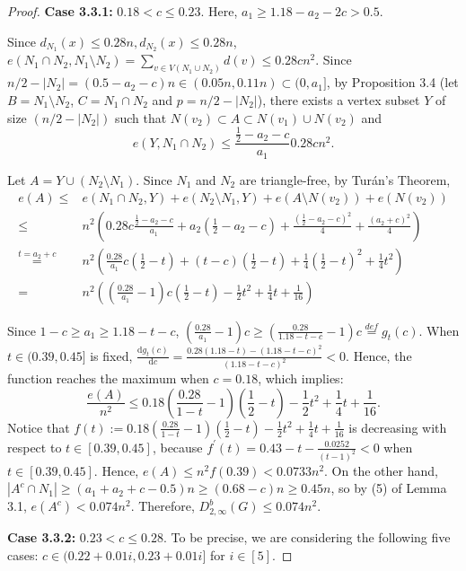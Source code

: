 \documentclass[11pt, oneside]{article}   	%
\begin{document}
\begin{proof}
\textbf{Case 3.3.1:} $0.18<c\leq 0.23$. Here, $a_1\geq 1.18-a_2-2c> 0.5$.

Since $d_{N_1}(x)\leq 0.28n,d_{N_2}(x)\leq 0.28n$, $e(N_1\cap N_2, N_1\setminus N_2)=\sum_{v\in V(N_1\cup N_2)}d(v) \leq 0.28c n^2$. Since $n/2-|N_2|=(0.5-a_2-c)n\in(0.05n,0.11n)\subset(0,a_1]$, by Proposition 3.4 (let $B=N_1\setminus N_2$, $C=N_1\cap N_2$ and $p=n/2-|N_2|$), there exists a vertex subset $Y$ of size $(n/2-|N_2|)$ such that $N(v_2)\subset A\subset N(v_1)\cup N(v_2)$ and
$$e(Y,N_1\cap N_2)\leq \frac{\frac 1 2-a_2-c}{a_1} 0.28c n^2.$$

 
Let $A=Y\cup (N_2\setminus N_1)$. Since $N_1$ and $N_2$ are triangle-free, by Turán's Theorem, 
$$
\begin{aligned}
    e(A)\leq & e(N_1\cap N_2,Y)+e(N_2\setminus N_1,Y)+e(A\setminus N(v_2))+e(N(v_2))\\
    \leq & n^2\left(0.28c \frac{\frac 1 2-a_2-c}{a_1}+a_2(\frac 1 2 -a_2-c)+\frac{\left(\frac{1}{2}-a_2-c\right)^2}{4}+\frac{(a_2+c)^2}{4}\right)\\
    \overset{t=a_2+c}{=}&n^2\left( \frac{0.28}{a_1}c(\frac1 2-t)+(t-c)(\frac 1 2-t)+\frac{1}{4}\left(\frac 1 2-t\right)^2+\frac{1}{4}t^2 \right)   \\
    =&n^2\left(\left(\frac{0.28}{a_1}-1\right)c\left(\frac 1 2-t\right)-\frac 1 2 t^2+\frac 1 4 t+\frac 1 {16}\right)
\end{aligned}
$$

Since $1-c\geq a_1\geq 1.18-t-c$, $\left(\frac{0.28}{a_1}-1\right)c\geq \left(\frac{0.28}{1.18-t-c}-1\right)c \overset{def}{=}g_t(c)$.
When $t\in(0.39,0.45]$ is fixed, $\frac {\mathrm{d}g_t (c)} {\mathrm{d}c}=\frac{0.28(1.18-t)-(1.18-t-c)^2}{(1.18-t-c)^2}<0.$ Hence, the function reaches the maximum when $c=0.18$, which implies:
$$
\frac{e(A)} {n^2}\leq 0.18\left(\frac{0.28}{1-t}-1\right)\left(\frac 1 2-t\right)-\frac 1 2 t^2+\frac 1 4 t+\frac 1 {16}.
$$
Notice that $f(t):= 0.18\left(\frac{0.28}{1-t}-1\right)\left(\frac 1 2-t\right)-\frac 1 2 t^2+\frac 1 4 t+\frac 1 {16}$ is decreasing with respect to $t\in[0.39,0.45]$, because $f^{'}(t)=0.43-t-\frac{0.0252}{(t-1)^2}<0$ when $t\in[0.39,0.45]$.
Hence, $e(A)\leq n^2 f(0.39)<0.0733n^2$. On the other hand, $|A^c\cap N_1|\geq (a_1+a_2+c-0.5)n\geq (0.68-c)n\geq 0.45n$, so by (5) of Lemma 3.1, $e(A^c)< 0.074n^2$. Therefore, $D_{2,\infty}^b(G)\leq 0.074n^2$.

\textbf{Case 3.3.2:} $0.23<c\leq 0.28$. To be precise, we are considering the following five cases: $c\in(0.22 + 0.01i, 0.23 + 0.01i]$ for $i \in [5]$.


\end{proof}
\end{document}
